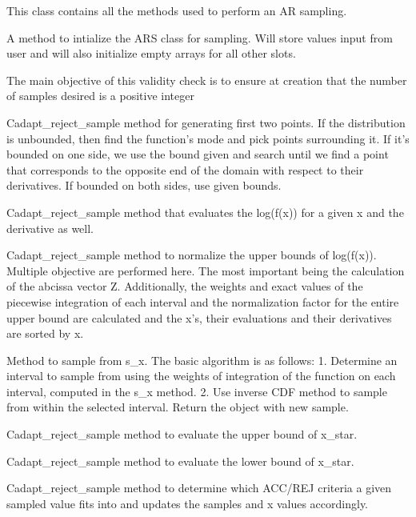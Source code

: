 \documentclass[a4paper]{book}
\begin{document}
%
\begin{Description}\relax
This class contains all the methods used to perform an AR
sampling.

A method to intialize the ARS class for sampling.  Will
store values input from user and will also initialize
empty arrays for all other slots.

The main objective of this validity check is to ensure at
creation that the number of samples desired is a positive
integer

Cadapt\_reject\_sample method for generating first two
points.  If the distribution is unbounded, then find the
function's mode and pick points surrounding it.  If it's
bounded on one side, we use the bound given and search
until we find a point that corresponds to the opposite
end of the domain with respect to their derivatives.  If
bounded on both sides, use given bounds.

Cadapt\_reject\_sample method that evaluates the log(f(x))
for a given x and the derivative as well.

Cadapt\_reject\_sample method to normalize the upper bounds
of log(f(x)).  Multiple objective are performed here. The
most important being the calculation of the abcissa
vector Z.  Additionally, the weights and exact values of
the piecewise integration of each interval and the
normalization factor for the entire upper bound are
calculated and the x's, their evaluations and their
derivatives are sorted by x.

Method to sample from s\_x.  The basic algorithm is as
follows: 1. Determine an interval to sample from using
the weights of integration of the function on each
interval, computed in the s\_x method. 2.  Use inverse CDF
method to sample from within the selected interval.
Return the object with new sample.

Cadapt\_reject\_sample method to evaluate the upper bound
of x\_star.

Cadapt\_reject\_sample method to evaluate the lower bound
of x\_star.

Cadapt\_reject\_sample method to determine which ACC/REJ
criteria a given sampled value fits into and updates the
samples and x values accordingly.
\end{Description}
\end{document}
